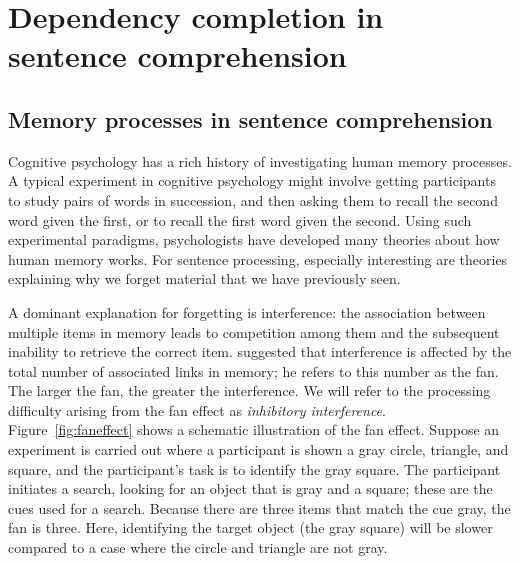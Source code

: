 \documentclass{cambridge7A}\usepackage[]{graphicx}\usepackage[]{color}
\begin{document}


\chapter{Dependency completion in sentence comprehension} \label{c01}

\section{Memory processes in sentence comprehension}

 
 Cognitive psychology has a rich history of investigating human memory processes. A typical experiment in cognitive psychology might involve getting participants to study pairs of words in succession, and then asking them to recall the second word given the first, or to recall the first word given the second.  Using such experimental paradigms, psychologists have  developed many   theories about how human memory works. For sentence processing, especially interesting are theories explaining why we forget material that we have previously seen.  
 
 A dominant explanation for forgetting is interference:  the association between multiple items in memory leads to competition among them and the subsequent inability to retrieve the correct item. \cite{anderson1974retrieval} suggested that interference is affected by the total number of associated links in memory; he refers to this number as the fan. The larger the fan, the greater the interference. We will refer to the processing difficulty arising from the  fan effect as  \textit{inhibitory interference}.
Figure~\ref{fig:faneffect}  shows a schematic illustration of the fan effect. Suppose an experiment is carried out where a participant is shown a gray circle, triangle, and square, and the participant's task is to identify the gray square. The participant initiates a search, looking for an object that is gray and a square; these are the cues used for a search. Because there are three items that match the cue gray, the fan is three. Here, identifying the target object (the gray square) will be slower compared to a case where the circle and triangle are not gray. 
\end{document}
